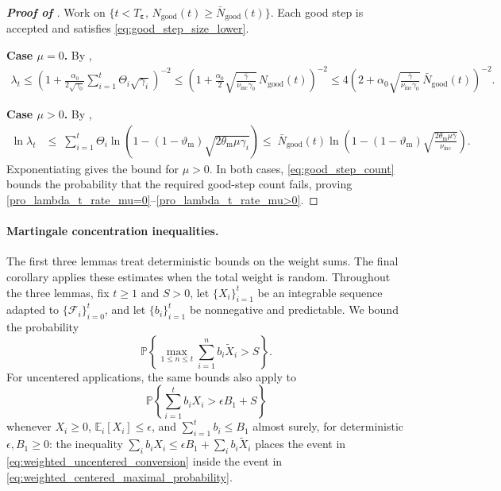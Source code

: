 \documentclass{article}
\begin{document}
\begin{proof}[\textbf{Proof of }]
\label{proof:good_step_contraction}
Work on \(\{t<T_{\boldsymbol\varepsilon},\,
N_{\mathrm{good}}(t)\ge\bar N_{\mathrm{good}}(t)\}\). Each good step is
accepted and satisfies \eqref{eq:good_step_size_lower}.

\noindent\textbf{Case \(\mu=0\).}
By ,
\begin{align*}
\lambda_t
\le
\left(
1+\frac{\alpha_0}{2\sqrt{\gamma_0}}
\sum_{i=1}^t\Theta_i\sqrt{\gamma_i}
\right)^{-2}
\le
\left(
1+\frac{\alpha_0}{2}
\sqrt{\frac{\bar\gamma}
{\nu_{\mathrm{inc}}\gamma_0}}\,
N_{\mathrm{good}}(t)
\right)^{-2}
\le
4\left(
2+\alpha_0
\sqrt{\frac{\bar\gamma}
{\nu_{\mathrm{inc}}\gamma_0}}\,
\bar N_{\mathrm{good}}(t)
\right)^{-2}.
\end{align*}

\noindent\textbf{Case \(\mu>0\).}
By ,
\begin{align*}
\ln\lambda_t
&\le\;
\sum_{i=1}^t
\Theta_i
\ln\left(
1-(1-\vartheta_{\mathrm{m}})
\sqrt{2\theta_{\mathrm{m}}\mu\gamma_i}
\right)
\le\;
\bar N_{\mathrm{good}}(t)
\ln\left(
1-(1-\vartheta_{\mathrm{m}})
\sqrt{
\frac{2\theta_{\mathrm{m}}\mu\bar\gamma}
{\nu_{\mathrm{inc}}}
}
\right).
\end{align*}
Exponentiating gives the bound for \(\mu>0\). In both cases,
\eqref{eq:good_step_count} bounds the probability that the required
good-step count fails, proving
\eqref{pro_lambda_t_rate_mu=0}--\eqref{pro_lambda_t_rate_mu>0}.
\end{proof}
\paragraph{Martingale concentration inequalities.}
The first three lemmas treat deterministic bounds on the weight sums.
The final corollary applies these estimates when the total weight is random.
Throughout the three lemmas, fix \(t\ge1\) and \(S>0\), let
\(\{X_i\}_{i=1}^t\) be an integrable sequence adapted to
\(\{\mathcal F_i\}_{i=0}^t\), and let \(\{b_i\}_{i=1}^t\) be
nonnegative and predictable. We bound the  probability
\begin{equation}\label{eq:weighted_centered_maximal_probability}
\mathbb P\left\{
\max_{1\le n\le t}\sum_{i=1}^n b_i\widetilde X_i>S
\right\}.
\end{equation}
For uncentered applications, the same bounds also apply to
\begin{equation}\label{eq:weighted_uncentered_conversion}
\mathbb P\left\{\sum_{i=1}^t b_iX_i>\epsilon B_1+S\right\}
\end{equation}
whenever \(X_i\ge0\), \(\mathbb E_i[X_i]\le\epsilon\), and
\(\sum_{i=1}^t b_i\le B_1\) almost surely, for deterministic
\(\epsilon,B_1\ge0\): the inequality
\(\sum_i b_iX_i\le\epsilon B_1+\sum_i b_i\widetilde X_i\)
places the event in \eqref{eq:weighted_uncentered_conversion} inside
the event in \eqref{eq:weighted_centered_maximal_probability}.
\end{document}
